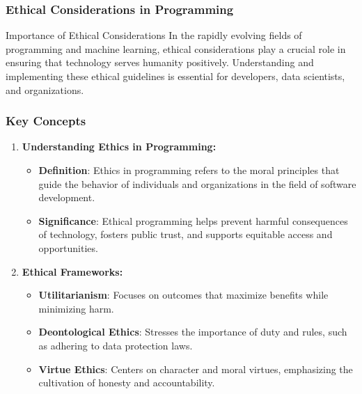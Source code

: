 \documentclass{beamer}
\begin{document}
\begin{frame}[fragile]
    \frametitle{Ethical Considerations in Programming}
    \begin{block}{Importance of Ethical Considerations}
        In the rapidly evolving fields of programming and machine learning, ethical considerations play a crucial role in ensuring that technology serves humanity positively. Understanding and implementing these ethical guidelines is essential for developers, data scientists, and organizations.
    \end{block}
\end{frame}

\begin{frame}[fragile]
    \frametitle{Key Concepts}
    \begin{enumerate}
        \item \textbf{Understanding Ethics in Programming:}
            \begin{itemize}
                \item \textbf{Definition}: Ethics in programming refers to the moral principles that guide the behavior of individuals and organizations in the field of software development.
                \item \textbf{Significance}: Ethical programming helps prevent harmful consequences of technology, fosters public trust, and supports equitable access and opportunities.
            \end{itemize}

        \item \textbf{Ethical Frameworks:}
            \begin{itemize}
                \item \textbf{Utilitarianism}: Focuses on outcomes that maximize benefits while minimizing harm.
                \item \textbf{Deontological Ethics}: Stresses the importance of duty and rules, such as adhering to data protection laws.
                \item \textbf{Virtue Ethics}: Centers on character and moral virtues, emphasizing the cultivation of honesty and accountability.
            \end{itemize}
    \end{enumerate}
\end{frame}
\end{document}
